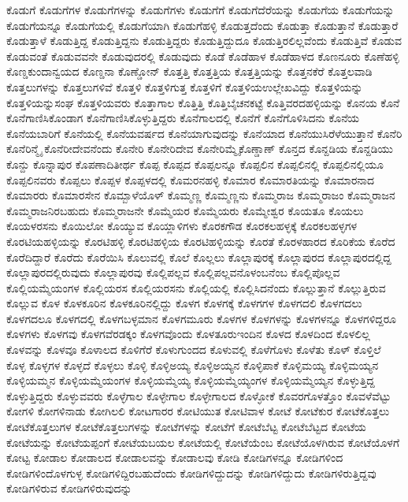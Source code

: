 {ಕೊಡುಗೆ
ಕೊಡುಗೆಗಳ
ಕೊಡುಗೆಗಳನ್ನು
ಕೊಡುಗೆಗಳು
ಕೊಡುಗೆಗೆ
ಕೊಡುಗೆದೆರೆಯನ್ನು
ಕೊಡುಗೆಯ
ಕೊಡುಗೆಯನ್ನು
ಕೊಡುಗೆಯನ್ನೂ
ಕೊಡುಗೆಯಲ್ಲಿ
ಕೊಡುಗೆಯಾಗಿ
ಕೊಡುಗೆಹಳ್ಳಿ
ಕೊಡುತ್ತದೆಂದು
ಕೊಡುತ್ತಾ
ಕೊಡುತ್ತಾನೆ
ಕೊಡುತ್ತಾರೆ
ಕೊಡುತ್ತಾಳೆ
ಕೊಡುತ್ತಿದ್ದ
ಕೊಡುತ್ತಿದ್ದನು
ಕೊಡುತ್ತಿದ್ದರು
ಕೊಡುತ್ತಿದ್ದುದೂ
ಕೊಡುತ್ತಿರಲಿಲ್ಲವೆಂದು
ಕೊಡುತ್ತಿವೆ
ಕೊಡುವ
ಕೊಡುವಂತೆ
ಕೊಡುವವನೇ
ಕೊಡುವುದರಲ್ಲಿ
ಕೊಡುವುದು
ಕೊಡೆ
ಕೊಡೆಹಾಳ
ಕೊಡೆಹಾಳದ
ಕೊಣನೂರು
ಕೊಣೆಹಳ್ಳಿ
ಕೊಣ್ಡಕುಂದಾನ್ವಯದ
ಕೊಣ್ಡನಾ
ಕೊಣ್ಡೋನ್
ಕೊತ್ತತ್ತಿ
ಕೊತ್ತತ್ತಿಯ
ಕೊತ್ತತ್ತಿಯನ್ನು
ಕೊತ್ತನಕೆರೆ
ಕೊತ್ತಲವಾಡಿ
ಕೊತ್ತಲುಗಳನ್ನು
ಕೊತ್ತಲುಗಳಿವೆ
ಕೊತ್ತಳಿ
ಕೊತ್ತಳಿಗುತ್ತ
ಕೊತ್ತಳಿಗೆ
ಕೊತ್ತಳಿಯಉಲ್ಲೇಖವಿದ್ದು
ಕೊತ್ತಳಿಯನ್ನು
ಕೊತ್ತಳಿಯನ್ನುಸಂಘ
ಕೊತ್ತಳಿಯವರು
ಕೊತ್ತಾಗಾಲ
ಕೊತ್ತಿತ್ತಿ
ಕೊತ್ತಿಬೈಚನಕಟ್ಟೆ
ಕೊತ್ತಿವರದಹಳ್ಳಿಯನ್ನು
ಕೊನಯ
ಕೊನೆ
ಕೊನೆಗಾಣಿಸಿಕೊಂಡಾಗ
ಕೊನೆಗಾಣಿಸಿಕೊಳ್ಳುತ್ತಿದ್ದರು
ಕೊನೆಗಾಲದಲ್ಲಿ
ಕೊನೆಗೆ
ಕೊನೆಗೊಳಿಸಿದನು
ಕೊನೆಯ
ಕೊನೆಯಬಾರಿಗೆ
ಕೊನೆಯಲ್ಲಿ
ಕೊನೆಯವರ್ಷದ
ಕೊನೆಯಾಗುವುದನ್ನು
ಕೊನೆಯಾದ
ಕೊನೆಯುಸಿರೆಳೆಯುತ್ತಾನೆ
ಕೊನೆರಿ
ಕೊನೆರಿನ್ಮೈ
ಕೊನೆರೀದೇವನೆಂದು
ಕೊನೇರಿ
ಕೊನೇರಿದೇವ
ಕೊನೇರಿಮ್ಮೈಕೊಣ್ಡಾಣ್
ಕೊನ್ತದ
ಕೊನ್ದಡಿಯ
ಕೊನ್ದಡಿಯು
ಕೊನ್ದು
ಕೊನ್ನಾಪುರ
ಕೊಪಣಾದಿತೀರ್ಥ
ಕೊಪ್ಪ
ಕೊಪ್ಪದ
ಕೊಪ್ಪಲನ್ನೂ
ಕೊಪ್ಪಲಿನ
ಕೊಪ್ಪಲಿನಲ್ಲಿ
ಕೊಪ್ಪಲಿನಲ್ಲಿಯೂ
ಕೊಪ್ಪಲಿನವರು
ಕೊಪ್ಪಲು
ಕೊಪ್ಪಳ
ಕೊಪ್ಪಳದಲ್ಲಿ
ಕೊಮರನಹಳ್ಳಿ
ಕೊಮಾರ
ಕೊಮಾರತಿಯನ್ನು
ಕೊಮಾರನಾದ
ಕೊಮಾರರು
ಕೊಮಾರಸೇನ
ಕೊಮ್ಬಾಳೆಯೊಳ್
ಕೊಮ್ಮಣ್ಣ
ಕೊಮ್ಮಣ್ಣನು
ಕೊಮ್ಮರಾಜ
ಕೊಮ್ಮರಾಜಂ
ಕೊಮ್ಮರಾಜನ
ಕೊಮ್ಮರಾಜನಿರಬಹುದು
ಕೊಮ್ಮರಾಜನೇ
ಕೊಮ್ಮೆಯರ
ಕೊಮ್ಮೆಯರು
ಕೊಮ್ಮೇಶ್ವರ
ಕೊಯತೂ
ಕೊಯಲು
ಕೊಯಳರಸನು
ಕೊಯಿಲೋ
ಕೊಯ್ಯುವ
ಕೊಯ್ಲಾಳಿಗಳು
ಕೊರಕಗೌಡ
ಕೊರಕಲಹಳ್ಳಕ್ಕೆ
ಕೊರಕಲಹಳ್ಳಗಳ
ಕೊರಟಿಯಹಳ್ಳಿಯನ್ನು
ಕೊರಟಿಹಳ್ಳಿ
ಕೊರಟಿಹಳ್ಳಿಯ
ಕೊರಟಿಹಳ್ಳಿಯನ್ನು
ಕೊರತೆ
ಕೊರಳಹಾರದ
ಕೊರಿಕೆಯ
ಕೊರೆದ
ಕೊರೆದಿದ್ದಾರೆ
ಕೊರೆದು
ಕೊರೆಯಿಸಿ
ಕೊಲುವಲ್ಲಿ
ಕೊಲೆ
ಕೊಲ್ಲಲು
ಕೊಲ್ಲಾಪುರಕ್ಕೆ
ಕೊಲ್ಲಾಪುರದ
ಕೊಲ್ಲಾಪುರದಲ್ಲಿದ್ದ
ಕೊಲ್ಲಾಪುರದಲ್ಲಿರುವುದು
ಕೊಲ್ಲಾಪುರವು
ಕೊಲ್ಲಿಪಲ್ಲವ
ಕೊಲ್ಲಿಪಲ್ಲವನೊಳಂಬನೆಂಬ
ಕೊಲ್ಲಿಪೊಲ್ಲವ
ಕೊಲ್ಲಿಯಮ್ಮೆಯಂಗಳ
ಕೊಲ್ಲಿಯರಸ
ಕೊಲ್ಲಿಯರಸನು
ಕೊಲ್ಲಿಯಲ್ಲಿ
ಕೊಲ್ಲಿಸಿದನೆಂದು
ಕೊಲ್ಲುತ್ತಾನೆ
ಕೊಲ್ಲುತ್ತಿರುವ
ಕೊಲ್ಲುವ
ಕೊಳ
ಕೊಳಕೂರಿನ
ಕೊಳಕೂರಿನಲ್ಲಿದ್ದು
ಕೊಳಗ
ಕೊಳಗಕ್ಕೆ
ಕೊಳಗಗಳ
ಕೊಳಗದಲಿ
ಕೊಳಗದಲು
ಕೊಳಗದಲೂ
ಕೊಳಗದಲ್ಲಿ
ಕೊಳಗಬಳ್ಳಮಾನ
ಕೊಳಗಮೂರು
ಕೊಳಗಳ
ಕೊಳಗಳನ್ನು
ಕೊಳಗಳನ್ನೂ
ಕೊಳಗಳಿದ್ದರೂ
ಕೊಳಗಳು
ಕೊಳಗವು
ಕೊಳಗವೆರಡಕ್ಕಂ
ಕೊಳಗವೊಂದು
ಕೊಳತೂರುಇಂದಿನ
ಕೊಳದ
ಕೊಳದಿಂದ
ಕೊಳಲಿಲ್ಲ
ಕೊಳವನ್ನು
ಕೊಳವೂ
ಕೊಳಾಲದ
ಕೊಳಿಗೆರೆ
ಕೊಳುಗುಂದದ
ಕೊಳುವಲ್ಲಿ
ಕೊಳೆಗೊಳು
ಕೊಳೆತು
ಕೊಳ್
ಕೊಳ್ತಿಲೆ
ಕೊಳ್ಳ
ಕೊಳ್ಳಗಳ
ಕೊಳ್ಳದೆ
ಕೊಳ್ಳಲು
ಕೊಳ್ಳಿ
ಕೊಳ್ಳಿಅಯ್ಯ
ಕೊಳ್ಳಿಅಯ್ಯನ
ಕೊಳ್ಳಿಪಾಕೆ
ಕೊಳ್ಳಿಮಯ್ಯ
ಕೊಳ್ಳಿಮಯ್ಯನ
ಕೊಳ್ಳಿಯಮ್ಮನ
ಕೊಳ್ಳಿಯಮ್ಮೆಯಂಗಳ
ಕೊಳ್ಳಿಯಮ್ಮೆಯ್ಯ
ಕೊಳ್ಳಿಯಮ್ಮೆಯ್ಯಂಗಳ
ಕೊಳ್ಳಿಯಮ್ಮೆಯ್ಯನ
ಕೊಳ್ಳುತ್ತಿದ್ದ
ಕೊಳ್ಳುತ್ತಿದ್ದರು
ಕೊಳ್ಳುವವರು
ಕೊಳ್ಳೆಗಾಲ
ಕೊಳ್ಳೇಗಾಲ
ಕೊಳ್ಳೇಗಾಲದ
ಕೊಳ್ಳೋಕೆ
ಕೊವರಗೊಳತ್ತೊಂ
ಕೊವಳೆವೆಟ್ಟು
ಕೋಗಳಿ
ಕೋಗಳಿನಾಡು
ಕೋಗಿಲಲಿ
ಕೋಟಗಾರರ
ಕೋಟಿಯುತ
ಕೋಟಿವಾಳ
ಕೋಟೆ
ಕೋಟೆಕುರ
ಕೋಟೆಕೊತ್ತಲು
ಕೋಟೆಕೊತ್ತಲುಗಳ
ಕೋಟೆಕೊತ್ತಲುಗಳನ್ನು
ಕೋಟೆಗಳನ್ನು
ಕೋಟೆಗೆ
ಕೋಟೆಬೆಟ್ಟ
ಕೋಟೆಬೆಟ್ಟದ
ಕೋಟೆಯ
ಕೋಟೆಯನ್ನು
ಕೋಟೆಯಪ್ಪಂಗೆ
ಕೋಟೆಯಬಯಲ
ಕೋಟೆಯಲ್ಲಿ
ಕೋಟೆಯೆಂಬ
ಕೋಟೆಯೊಳಗಿರುವ
ಕೋಟೆಯೊಳಗೆ
ಕೋಟ್ಟ
ಕೋಡಾಲ
ಕೋಡಾಲದ
ಕೋಡಾಲವನ್ನು
ಕೋಡಾಲವು
ಕೋಡಿ
ಕೋಡಿಗಳನ್ನೂ
ಕೋಡಿಗಳಿಂದ
ಕೋಡಿಗಳಿಂದೊಳಗುಳ್ಳ
ಕೋಡಿಗಳಿದ್ದಿರಬಹುದೆಂದು
ಕೋಡಿಗಳಿದ್ದುದನ್ನು
ಕೋಡಿಗಳಿದ್ದುದು
ಕೋಡಿಗಳಿರುತ್ತಿದ್ದವು
ಕೋಡಿಗಳಿರುವ
ಕೋಡಿಗಳಿರುವುದನ್ನು
}
